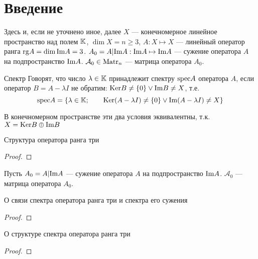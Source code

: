 \section{Введение}

Здесь и, если не уточнено иное, далее $X$ --- конечномерное линейное пространство над полем $\mathbb{K}$,
$\dim X = n \geq 3$,
$A : X\mapsto X$ --- линейный оператор ранга $\mathrm{rg} A = \dim\mathrm{Im} A = 3$.
$A_0 = A|\mathrm{Im} A : \mathrm{Im} A\mapsto \mathrm{Im} A$ --- сужение оператора $A$ на подпространство $\mathrm{Im} A$.
$\mathcal A_0 \in \mathrm{Matr}_n$ --- матрица оператора $A_0$.

\begin{dfn}{Спектр}
  Говорят, что число $\lambda\in\mathbb{K}$ принадлежит спектру $\mathrm{spec} A$ оператора $A$,
  если оператор $B = A - \lambda I$ не обратим:
  $\mathrm{Ker} B \neq \{0\} \lor \mathrm{Im} B \neq X$, т.е.
  $$ \mathrm{spec} A = \{ \lambda\in\mathbb{K} ;\qquad \mathrm{Ker} (A-\lambda I) \neq \{0\} \lor \mathrm{Im} (A-\lambda I) \neq X \}$$

  В конечномерном пространстве эти два условия эквивалентны, т.к. $X = \mathrm{Ker} B \oplus \mathrm{Im} B$
\end{dfn}

\begin{thm}{Структура оператора ранга три}
  
\end{thm}
\begin{proof}
  
\end{proof}

Пусть $A_0 = A|\mathrm{Im} A$ --- сужение оператора $A$ на подпространство $\mathrm{Im} A$.
$\mathcal A_0$ --- матрица оператора $A_0$.

\begin{thm}{О связи спектра оператора ранга три и спектра его сужения}
  
\end{thm}
\begin{proof}
  
\end{proof}

\begin{thm}{О структуре спектра оператора ранга три}\*

  
\end{thm}
\begin{proof}
  
\end{proof}
